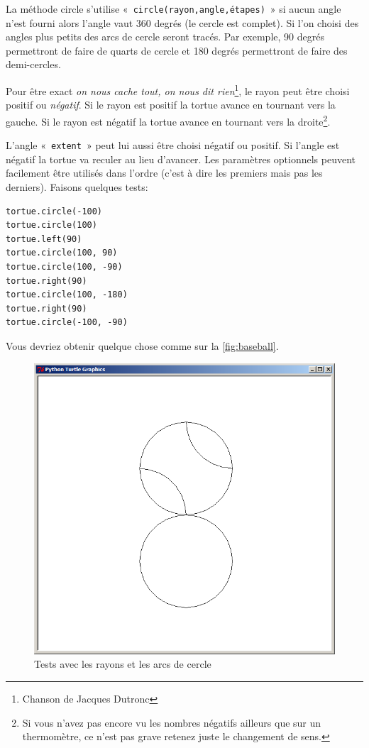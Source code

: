 La méthode circle s'utilise « \texttt{circle(rayon,angle,étapes)} » si aucun angle n'est fourni alors l'angle vaut 360 degrés (le cercle est complet). Si l'on choisi des angles plus petits des arcs de cercle seront tracés. Par exemple, 90 degrés permettront de faire de quarts de cercle et 180 degrés permettront de faire des demi-cercles.

Pour être exact \emph{on nous cache tout, on nous dit rien}\footnote{Chanson de Jacques Dutronc}, le rayon peut être choisi positif ou \emph{négatif}. Si le rayon est positif la tortue avance en tournant vers la gauche. Si le rayon est négatif la tortue avance en tournant vers la droite\footnote{Si vous n'avez pas encore vu les nombres négatifs ailleurs que sur un thermomètre, ce n'est pas grave retenez juste le changement de sens.}.

L'angle « \texttt{extent} » peut lui aussi être choisi négatif ou positif. Si l'angle est négatif la tortue va reculer au lieu d'avancer. Les paramètres optionnels peuvent facilement être utilisés dans l'ordre (c'est à dire les premiers mais pas les derniers). Faisons quelques tests:

\begin{Verbatim}[frame=single,rulecolor=\color{mbleu}, label=à taper]
tortue.circle(-100)
tortue.circle(100)
tortue.left(90)
tortue.circle(100, 90)
tortue.circle(100, -90)
tortue.right(90)
tortue.circle(100, -180)
tortue.right(90)
tortue.circle(-100, -90)
\end{Verbatim}

Vous devriez obtenir quelque chose comme sur la \autoref{fig:baseball}.

\begin{figure}[h!]
\centering
\includegraphics[scale=0.4]{images/baseball}
\caption{Tests avec les rayons et les arcs de cercle}\label{fig:baseball}
\end{figure}

